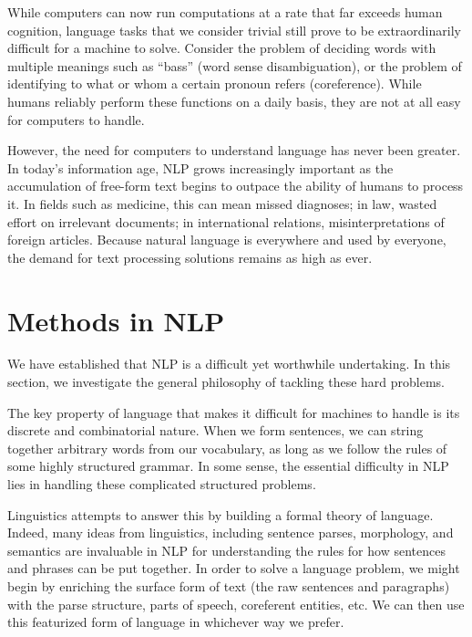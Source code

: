 \documentclass[12pt]{report}
\begin{document}
While computers can now run computations at a rate that far exceeds human cognition, language tasks that we consider trivial still prove to be extraordinarily difficult for a machine to solve. Consider the problem of deciding words with multiple meanings such as ``bass'' (word sense disambiguation), or the problem of identifying to what or whom a certain pronoun refers (coreference). 
While humans reliably perform these functions on a daily basis, they are not at all easy for computers to handle.


However, the need for computers to understand language has never been greater.
In today's information age, NLP grows increasingly important as the accumulation of free-form text begins to outpace the ability of humans to process it. In fields such as medicine, this can mean missed diagnoses; in law, wasted effort on irrelevant documents; in international relations, misinterpretations of foreign articles.
Because natural language is everywhere and used by everyone, the demand for text processing solutions remains as high as ever.

\section{Methods in NLP}

We have established that NLP is a difficult yet worthwhile undertaking. In this section, we investigate the general philosophy of tackling these hard problems.

The key property of language that makes it difficult for machines to handle is its discrete and combinatorial nature. When we form sentences, we can string together arbitrary words from our vocabulary, as long as we follow the rules of some highly structured grammar. In some sense, the essential difficulty in NLP lies in handling these complicated structured problems.

Linguistics attempts to answer this by building a formal theory of language. Indeed, many ideas from linguistics, including sentence parses, morphology, and semantics are invaluable in NLP for understanding the rules for how sentences and phrases can be put together.
In order to solve a language problem, we might begin by enriching the surface form of text (the raw sentences and paragraphs) with the parse structure, parts of speech, coreferent entities, etc. We can then use this featurized form of language in whichever way we prefer.
\end{document}
